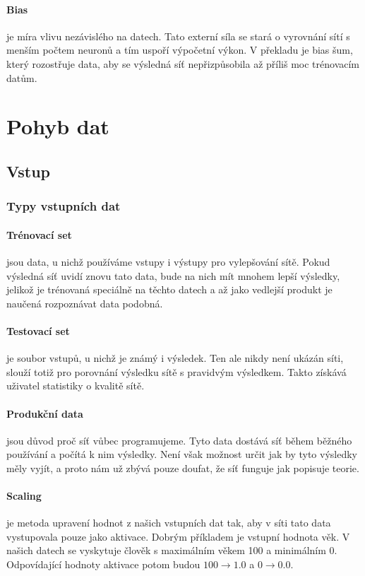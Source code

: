 \documentclass[12pt,a4paper]{report}
\begin{document}
	\paragraph{Bias}
	je míra vlivu nezávislého na datech. Tato externí síla se stará o vyrovnání sítí s menším počtem neuronů a tím uspoří výpočetní výkon. V překladu je bias šum, který rozostřuje data, aby se výsledná síť nepřizpůsobila až příliš moc trénovacím datům.
		
\section{Pohyb dat}
	\subsection{Vstup}
		\subsubsection{Typy vstupních dat}
			\paragraph{Trénovací set}
			jsou data, u nichž používáme vstupy i výstupy pro vylepšování sítě. Pokud výsledná síť uvidí znovu tato data, bude na nich mít mnohem lepší výsledky, jelikož je trénovaná speciálně na těchto datech a až jako vedlejší produkt je naučená rozpoznávat data podobná.
			\paragraph{Testovací set}
			je soubor vstupů, u nichž je známý i výsledek. Ten ale nikdy není ukázán síti, slouží totiž pro porovnání výsledku sítě s pravidvým výsledkem. Takto získává uživatel statistiky o kvalitě sítě.
			\paragraph{Produkční data}
			jsou důvod proč síť vůbec programujeme. Tyto data dostává síť během běžného používání a počítá k nim výsledky. Není však možnost určit jak by tyto výsledky měly vyjít, a proto nám už zbývá pouze doufat, že síť funguje jak popisuje teorie.
		\paragraph{Scaling}
		je metoda upravení hodnot z našich vstupních dat tak, aby v síti tato data vystupovala pouze jako aktivace. Dobrým příkladem je vstupní hodnota věk. V našich datech se vyskytuje člověk s maximálním věkem 100 a minimálním 0. Odpovídající hodnoty aktivace potom budou $100\rightarrow1.0$ a $0\rightarrow0.0$.
\end{document}
